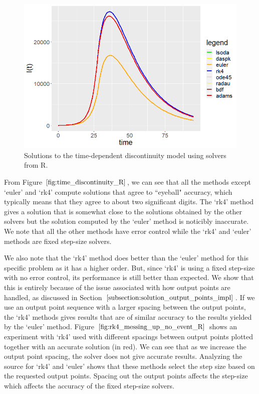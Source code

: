 \begin{figure}[H]
\centering
\includegraphics[width=0.7\linewidth]{./figures/time_discontinuity_R}
\caption{Solutions to the time-dependent discontinuity model using solvers from R.}
\label{fig:time_discontinuity_R}
\end{figure}

From Figure $\ref{fig:time_discontinuity_R}$, we can see that all the methods except `euler' and `rk4' compute solutions that agree to ``eyeball" accuracy, which typically means that they agree to about two significant digits. The `rk4' method gives a solution that is somewhat close to the solutions obtained by the other solvers but the solution computed by the `euler' method is noticibly inaccurate. We note that all the other methods have error control while the `rk4' and `euler' methods are fixed step-size solvers.

We also note that the `rk4' method does better than the `euler' method for this specific problem as it has a higher order. But, since `rk4' is using a fixed step-size with no error control, its performance is still better than expected. We show that this is entirely because of the issue associated with how output points are handled, as discussed in Section $\ref{subsection:solution_output_points_impl}$. If we use an output point sequence with a larger spacing between the output points, the `rk4' methods gives results that are of similar accuracy to the results yielded by the  `euler' method. Figure $\ref{fig:rk4_messing_up_no_event_R}$ shows an experiment with `rk4' used with different spacings between output points plotted together with an accurate solution (in red). We can see that as we increase the output point spacing, the solver does not give accurate results. Analyzing the source for `rk4' and `euler' shows that these methods select the step size based on the requested output points. Spacing out the output points affects the step-size which affects the accuracy of the fixed step-size solvers.

